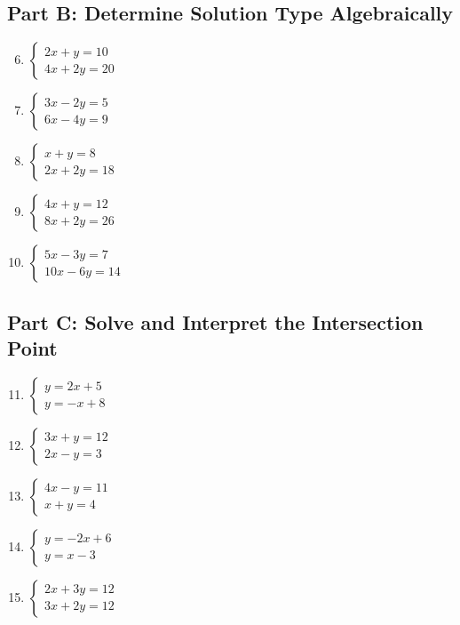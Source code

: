 \documentclass[14pt]{extarticle}
\begin{document}
\subsection*{Part B: Determine Solution Type Algebraically}
\begin{enumerate}
    \setcounter{enumi}{5}
    \item \(\begin{cases} 2x + y = 10 \\ 4x + 2y = 20 \end{cases}\)
    \item \(\begin{cases} 3x - 2y = 5 \\ 6x - 4y = 9 \end{cases}\)
    \item \(\begin{cases} x + y = 8 \\ 2x + 2y = 18 \end{cases}\)
    \item \(\begin{cases} 4x + y = 12 \\ 8x + 2y = 26 \end{cases}\)
    \item \(\begin{cases} 5x - 3y = 7 \\ 10x - 6y = 14 \end{cases}\)
\end{enumerate}

\subsection*{Part C: Solve and Interpret the Intersection Point}
\begin{enumerate}
    \setcounter{enumi}{10}
    \item \(\begin{cases} y = 2x + 5 \\ y = -x + 8 \end{cases}\)
    \item \(\begin{cases} 3x + y = 12 \\ 2x - y = 3 \end{cases}\)
    \item \(\begin{cases} 4x - y = 11 \\ x + y = 4 \end{cases}\)
    \item \(\begin{cases} y = -2x + 6 \\ y = x - 3 \end{cases}\)
    \item \(\begin{cases} 2x + 3y = 12 \\ 3x + 2y = 12 \end{cases}\)
\end{enumerate}
\end{document}
